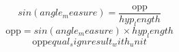 \[sin({angle_measure})=\frac{{\text{{{opp}}}}}{{{hyp_length}}}\]
\[\text{{{opp}}}=sin({angle_measure})\times {hyp_length}\]
\[\text{{{opp}}}{equal_sign}{result_with_unit}\]
